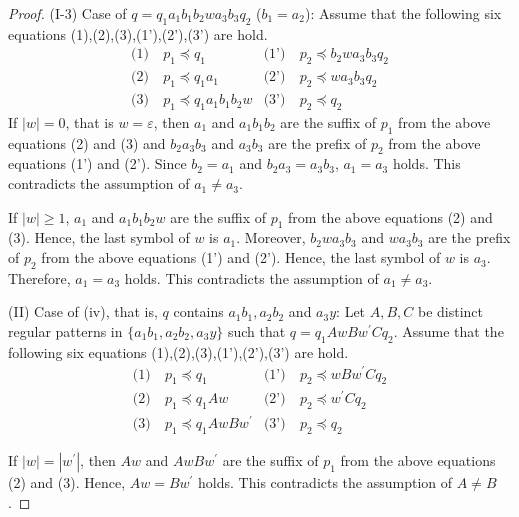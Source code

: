 \begin{proof}
\noindent
(I-3) Case of $q=q_{1}a_{1}b_{1}b_{2}wa_{3}b_{3}q_{2}$ ($b_{1}=a_{2}$):
Assume that the following six equations (1),(2),(3),(1'),(2'),(3') are hold.
\begin{align*}
\textrm{(1)}~& p_{1} \preceq q_{1} & \textrm{(1')}~& p_{2} \preceq b_{2}wa_{3}b_{3}q_{2} \\
\textrm{(2)}~& p_{1} \preceq q_{1}a_{1} & \textrm{(2')}~& p_{2} \preceq wa_{3}b_{3}q_{2} \\
\textrm{(3)}~& p_{1} \preceq q_{1}a_{1}b_{1}b_{2}w & \textrm{(3')}~& p_{2} \preceq q_{2}
\end{align*}
\noindent
If $|w|=0$, that is $w=\varepsilon$, then $a_{1}$ and $a_{1}b_{1}b_{2}$ are the suffix of $p_{1}$ from the above equations (2) and (3)
and $b_{2}a_{3}b_{3}$ and $a_{3}b_{3}$ are the prefix of $p_{2}$ from the above equations (1') and (2').
Since $b_{2}=a_{1}$ and $b_{2}a_{3}=a_{3}b_{3}$, $a_{1}=a_{3}$ holds.
This contradicts the assumption of $a_{1}\not= a_{3}$.

\noindent
If $|w| \ge 1$, $a_{1}$ and $a_{1}b_{1}b_{2}w$ are the suffix of $p_{1}$ from the above equations (2) and (3).
Hence, the last symbol of $w$ is $a_{1}$.
Moreover, $b_{2}wa_{3}b_{3}$ and $wa_{3}b_{3}$ are the prefix of $p_{2}$ from the above equations (1') and (2').
Hence, the last symbol of $w$ is $a_{3}$.
Therefore, $a_{1}=a_{3}$ holds.
This contradicts the assumption of $a_{1} \ne a_{3}$.
\smallskip

\noindent
(II) Case of (iv), that is, $q$ contains $a_{1}b_{1}, a_{2}b_{2}$ and $a_{3}y$:
Let $A,B,C$ be distinct regular patterns in $\{a_{1}b_{1}, a_{2}b_{2}, a_{3}y\}$ such that $q=q_{1}AwBw^{\prime}Cq_{2}$.
Assume that the following six equations (1),(2),(3),(1'),(2'),(3') are hold.
\begin{align*}
\textrm{(1)}~& p_{1} \preceq q_{1} & \textrm{(1')}~& p_{2} \preceq wBw^{\prime}Cq_{2} \\
\textrm{(2)}~& p_{1} \preceq q_{1}Aw & \textrm{(2')}~& p_{2} \preceq w^{\prime}Cq_{2} \\
\textrm{(3)}~& p_{1} \preceq q_{1}AwBw^{\prime} & \textrm{(3')}~& p_{2} \preceq q_{2}
\end{align*}

\noindent
If $|w|=|w^{\prime}|$, then $Aw$ and $AwBw^{\prime}$ are the suffix of $p_{1}$ from the above equations (2) and (3).
Hence, $Aw=Bw^{\prime}$ holds.
This contradicts the assumption of $A \ne B$.


\end{proof}
